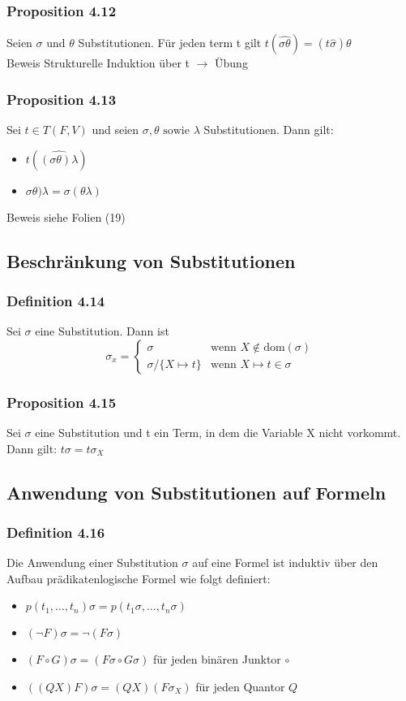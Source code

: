 \subsubsection{Proposition 4.12}
Seien \(\sigma\) und \(\theta\) Substitutionen. Für jeden term t gilt \(t(\hat{\sigma\theta}) = (t\hat{\sigma})\theta \) \\ Beweis Strukturelle Induktion über t \(\to\) Übung
\subsubsection{Proposition 4.13}
Sei \(t \in T(F,V) \) und seien \(\sigma, \theta    \text{ sowie } \lambda \) Substitutionen. Dann gilt:
\begin{itemize}
	\item \( t (\hat{(\sigma\theta)\lambda})\)
	\item \(\sigma\theta)\lambda = \sigma(\theta\lambda)\)
\end{itemize}
Beweis siehe Folien (19)
\subsection{Beschränkung von Substitutionen}
\subsubsection{Definition 4.14}
Sei \(\sigma\) eine Substitution. Dann ist 
\begin{displaymath}
	\sigma_{x} = \begin{cases} \sigma &\text{wenn } X \notin \text{dom}( \sigma ) \\
\sigma / \{ X \mapsto t \} &\text{wenn } X \mapsto t \in\sigma
\end{cases}
\end{displaymath}
\subsubsection{Proposition 4.15}
Sei \(\sigma\) eine Substitution und t ein Term, in dem die Variable X nicht vorkommt.\\ Dann gilt: \(t\sigma = t\sigma_{X} \)
\subsection{Anwendung von Substitutionen auf Formeln}
\subsubsection{Definition 4.16}
Die Anwendung einer Substitution \(\sigma\) auf eine Formel ist induktiv über den Aufbau prädikatenlogische Formel wie folgt definiert:
\begin{itemize}
	\item \( p(t_{1} , \ldots , t_{n} ) \sigma = p(t_{1}\sigma , \ldots , t_{n}\sigma ) \)
	\item \((\neg F)\sigma = \neg (F\sigma) \)
	\item \((F\circ G)\sigma = (F\sigma \circ G\sigma)\) für jeden binären Junktor \(\circ\)
	\item \(((QX)F)\sigma = (QX)(F\sigma_{X})\) für jeden Quantor \(Q\)
\end{itemize}
